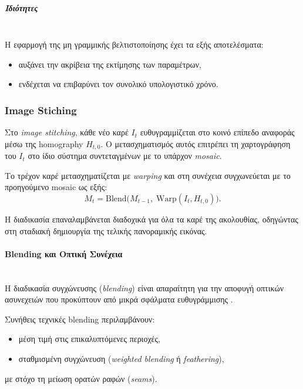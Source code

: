 \documentclass[12pt]{article}
\begin{document}
\subparagraph{Ιδιότητες}
\mbox{}\\
Η εφαρμογή της μη γραμμικής βελτιστοποίησης έχει τα εξής αποτελέσματα:
\begin{itemize}
    \item αυξάνει την ακρίβεια της εκτίμησης των παραμέτρων,
    \item ενδέχεται να επιβαρύνει τον συνολικό υπολογιστικό χρόνο.
\end{itemize}


\subsubsection{Image Stiching}
Στο \textit{image stitching}, κάθε νέο καρέ \(I_t\) ευθυγραμμίζεται στο κοινό επίπεδο αναφοράς μέσω της homography \(H_{t,0}\). Ο μετασχηματισμός αυτός επιτρέπει τη χαρτογράφηση του \(I_t\) στο ίδιο σύστημα συντεταγμένων με το υπάρχον \textit{mosaic}.

Το τρέχον καρέ μετασχηματίζεται με \textit{warping} και στη συνέχεια συγχωνεύεται με το προηγούμενο mosaic ως εξής:
\[
M_t = \text{Blend}\big( M_{t-1}, \; \text{Warp}(I_t, H_{t,0}) \big).
\]

Η διαδικασία επαναλαμβάνεται διαδοχικά για όλα τα καρέ της ακολουθίας, οδηγώντας στη σταδιακή δημιουργία της τελικής πανοραμικής εικόνας.

\paragraph{Blending και Οπτική Συνέχεια}
\mbox{}\\
Η διαδικασία συγχώνευσης (\textit{blending}) είναι απαραίτητη για την αποφυγή οπτικών ασυνεχειών που προκύπτουν από μικρά σφάλματα ευθυγράμμισης .

Συνήθεις τεχνικές blending περιλαμβάνουν:
\begin{itemize}
    \item μέση τιμή στις επικαλυπτόμενες περιοχές,
    \item σταθμισμένη συγχώνευση (\textit{weighted blending} ή \textit{feathering}),
\end{itemize}
με στόχο τη μείωση ορατών ραφών (\textit{seams}).
\end{document}
